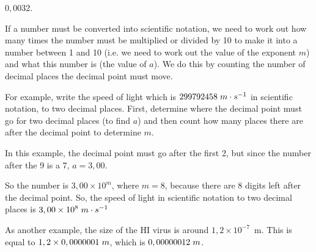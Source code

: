 $0,0032$.\par 
      \label{m38346*id177971}If a number must be converted into scientific notation, we need to work out how
many times the number must be multiplied or divided by 10 to make it into a
number between 1 and 10 (i.e. we need to work out the value of the exponent $m$)
and what this number is (the value of $a$). We do this by counting the number of
decimal places the decimal point must move.\par 
      \label{m38346*id177995}For example, write the speed of light which is $299 792 458\phantom{\rule{3pt}{0ex}}m\ensuremath{\cdot}s{}^{-1}$ in
scientific notation, to two decimal places. First, determine where the decimal
point must go for two decimal places (to find $a$) and then count how many
places there are after the decimal point to determine $m$.\par 
      \label{m38346*id178035}In this example, the decimal point must go after the first 2, but since the
number after the 9 is a 7, $a=3,00$.\par 
      \label{m38346*id178057}So the number is $3,00\ensuremath{\times}{10}^{m}$, where $m=8$, because there are 8 digits
left after the decimal point. So, the speed of light in scientific notation to
two decimal places is $3,00\ensuremath{\times}{10}^{8}\phantom{\rule{3pt}{0ex}}m\ensuremath{\cdot}s{}^{-1}$\par 
      \label{m38346*id178140}As another example, the size of the HI virus is around $1,2\ensuremath{\times}{10}^{-7}$~m.
This is equal to $1,2\ensuremath{\times}0,0000001\phantom{\rule{3pt}{0ex}}m$, which is $0,00000012\phantom{\rule{3pt}{0ex}}m$.\par 
